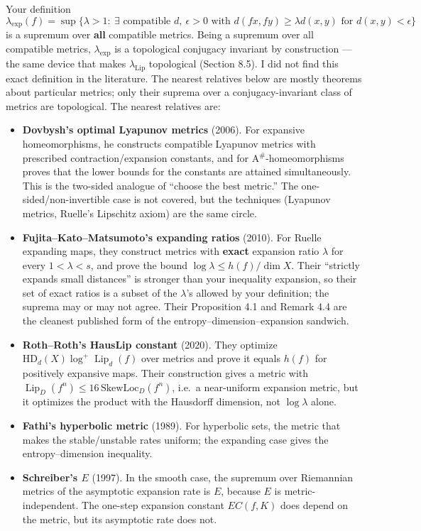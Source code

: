 \documentclass[
]{article}
\providecommand{\tightlist}{%
  \setlength{\itemsep}{0pt}\setlength{\parskip}{0pt}}
\begin{document}
Your definition \[
\lambda_{\exp}(f)=\sup\{\lambda>1:\ \exists\text{ compatible }d,\ \epsilon>0\text{ with }d(fx,fy)\ge\lambda d(x,y)\text{ for }d(x,y)<\epsilon\}
\] is a supremum over \textbf{all} compatible metrics. Being a supremum
over all compatible metrics, \(\lambda_{\exp}\) is a topological
conjugacy invariant by construction --- the same device that makes
\(\lambda_{\mathrm{Lip}}\) topological (Section 8.5). I did not find
this exact definition in the literature. The nearest relatives below are
mostly theorems about particular metrics; only their suprema over a
conjugacy-invariant class of metrics are topological. The nearest
relatives are:

\begin{itemize}
\tightlist
\item
  \textbf{Dovbysh's optimal Lyapunov metrics} (2006). For expansive
  homeomorphisms, he constructs compatible Lyapunov metrics with
  prescribed contraction/expansion constants, and for
  A$^{\#}$-homeomorphisms proves that the lower bounds for the constants
  are attained simultaneously. This is the two-sided analogue of
  ``choose the best metric.'' The one-sided/non-invertible case is not
  covered, but the techniques (Lyapunov metrics, Ruelle's Lipschitz
  axiom) are the same circle.
\item
  \textbf{Fujita--Kato--Matsumoto's expanding ratios} (2010). For Ruelle
  expanding maps, they construct metrics with \textbf{exact} expansion
  ratio \(\lambda\) for every \(1<\lambda<s\), and prove the bound
  \(\log\lambda\le h(f)/\dim X\). Their ``strictly expands small
  distances'' is stronger than your inequality expansion, so their set
  of exact ratios is a subset of the \(\lambda\)'s allowed by your
  definition; the suprema may or may not agree. Their Proposition 4.1
  and Remark 4.4 are the cleanest published form of the
  entropy--dimension--expansion sandwich.
\item
  \textbf{Roth--Roth's HausLip constant} (2020). They optimize
  \(\mathrm{HD}_d(X)\log^+\operatorname{Lip}_d(f)\) over metrics and
  prove it equals \(h(f)\) for positively expansive maps. Their
  construction gives a metric with
  \(\operatorname{Lip}_D(f^n)\le16\,\mathrm{SkewLoc}_D(f^n)\), i.e.~a
  near-uniform expansion metric, but it optimizes the product with the
  Hausdorff dimension, not \(\log\lambda\) alone.
\item
  \textbf{Fathi's hyperbolic metric} (1989). For hyperbolic sets, the
  metric that makes the stable/unstable rates uniform; the expanding
  case gives the entropy--dimension inequality.
\item
  \textbf{Schreiber's \(E\)} (1997). In the smooth case, the supremum
  over Riemannian metrics of the asymptotic expansion rate is \(E\),
  because \(E\) is metric-independent. The one-step expansion constant
  \(EC(f,K)\) does depend on the metric, but its asymptotic rate does
  not.
\end{itemize}
\end{document}
